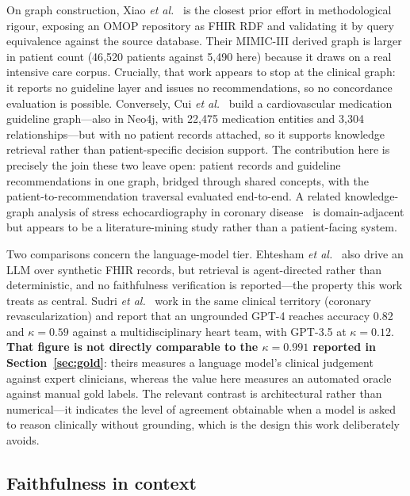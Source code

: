 On graph construction, Xiao \textit{et al.}~\cite{xiao2022} is the closest prior effort in
methodological rigour, exposing an OMOP repository as FHIR RDF and validating it by
query equivalence against the source database. Their MIMIC-III derived graph
is larger in patient count (46{,}520 patients against 5{,}490 here) because
it draws on a real intensive care corpus. Crucially, that work appears to stop
at the clinical graph: it reports no guideline layer and issues no
recommendations, so no concordance evaluation is possible. Conversely, Cui
\textit{et al.}~\cite{cui2025} build a cardiovascular medication guideline graph---also in
Neo4j, with 22{,}475 medication entities and 3{,}304
relationships---but with no patient records attached, so it supports
knowledge retrieval rather than patient-specific decision support. The contribution here is
precisely the join these two leave open: patient records and guideline recommendations in
one graph, bridged through shared concepts, with the patient-to-recommendation traversal
evaluated end-to-end. A related knowledge-graph analysis of stress echocardiography in
coronary disease~\cite{wu2023} is domain-adjacent but appears to be
a literature-mining study rather than a patient-facing system.

Two comparisons concern the language-model tier. Ehtesham \textit{et al.}~\cite{ehtesham2025}
also drive an LLM over synthetic FHIR records, but retrieval is agent-directed
rather than deterministic, and no faithfulness verification is reported---the property this
work treats as central. Sudri \textit{et al.}~\cite{sudri2024} work in the same clinical
territory (coronary revascularization) and report that an ungrounded GPT-4 reaches accuracy
0.82 and $\kappa = 0.59$ against a multidisciplinary heart
team, with GPT-3.5 at $\kappa = 0.12$.
\textbf{That figure is not directly comparable to the $\kappa = 0.991$ reported
in Section~\ref{sec:gold}}: theirs measures a language model's clinical judgement against
expert clinicians, whereas the value here measures an automated oracle against manual gold
labels. The relevant contrast is architectural rather than numerical---it indicates the
level of agreement obtainable when a model is asked to reason clinically without grounding,
which is the design this work deliberately avoids.

\subsection{Faithfulness in context}

